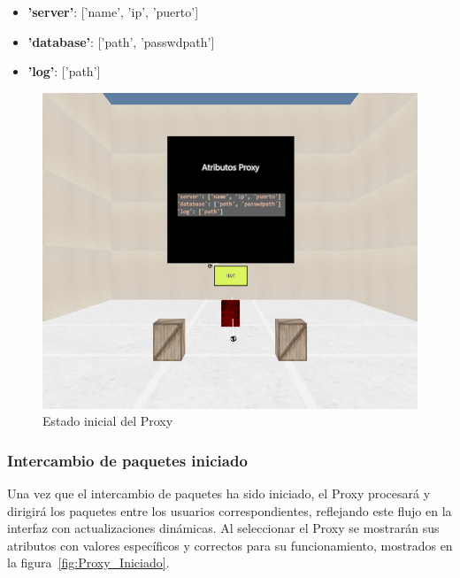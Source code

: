 \documentclass[a4paper, 12pt]{book}
\begin{document}
\begin{itemize}
  \item \textbf{'server'}: ['name', 'ip', 'puerto']
  \item \textbf{'database'}: ['path', 'passwdpath']
  \item \textbf{'log'}: ['path']
\end{itemize}

\begin{figure}
  \centering
  \includegraphics[width=15cm, keepaspectratio]{img/resultados/Proxy_NoIniciado.png}
  \caption{Estado inicial del Proxy}
  \label{fig:Proxy_NoIniciado}
\end{figure}

\subsubsection{Intercambio de paquetes iniciado}
\label{subsubsec:Proxy_Intercambio_Iniciado}
Una vez que el intercambio de paquetes ha sido iniciado, el Proxy procesará y dirigirá los paquetes entre los usuarios correspondientes, 
reflejando este flujo en la interfaz con actualizaciones dinámicas. Al seleccionar el Proxy se mostrarán sus atributos con valores específicos 
y correctos para su funcionamiento, mostrados en la figura~\ref{fig:Proxy_Iniciado}.
\end{document}
